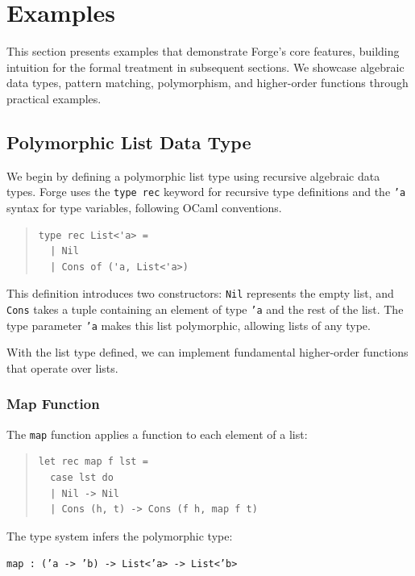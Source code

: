 \documentclass[conference,onecolumn]{IEEEtran}
\begin{document}
\newpage
\section{Examples}

This section presents examples that demonstrate Forge's core features, building intuition for the formal treatment in subsequent sections. We showcase algebraic data types, pattern matching, polymorphism, and higher-order functions through practical examples.

\subsection{Polymorphic List Data Type}

We begin by defining a polymorphic list type using recursive algebraic data types. Forge uses the \texttt{type rec} keyword for recursive type definitions and the \texttt{'a} syntax for type variables, following OCaml conventions.

\begin{quote}
\small
\begin{verbatim}
type rec List<'a> = 
  | Nil 
  | Cons of ('a, List<'a>)
\end{verbatim}
\end{quote}

This definition introduces two constructors: \texttt{Nil} represents the empty list, and \texttt{Cons} takes a tuple containing an element of type \texttt{'a} and the rest of the list. The type parameter \texttt{'a} makes this list polymorphic, allowing lists of any type.

With the list type defined, we can implement fundamental higher-order functions that operate over lists.

\subsubsection{Map Function}

The \texttt{map} function applies a function to each element of a list:

\begin{quote}
\small
\begin{verbatim}
let rec map f lst =
  case lst do
  | Nil -> Nil
  | Cons (h, t) -> Cons (f h, map f t)
\end{verbatim}
\end{quote}

The type system infers the polymorphic type:
\begin{center}
\texttt{map : ('a -> 'b) -> List<'a> -> List<'b>}
\end{center}
\end{document}
